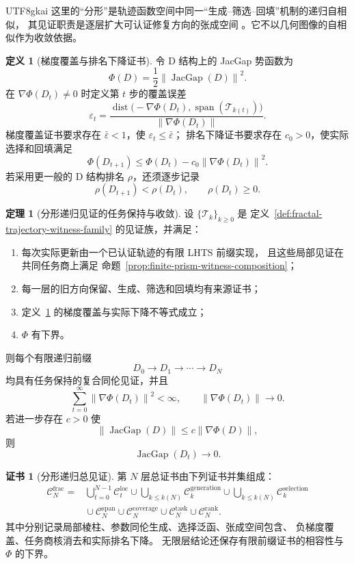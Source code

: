 \documentclass[12pt]{report}
\theoremstyle{definition}
\newtheorem{definition}{定义}[chapter]
\newtheorem{theorem}{定理}[chapter]
\newtheorem{Certificate}{证书}[chapter]
\newcommand{\JacGap}{\operatorname{JacGap}}
\newcommand{\norm}[1]{\left\lVert#1\right\rVert}
\begin{document}
\begin{CJK*}{UTF8}{gkai}
这里的“分形”是轨迹函数空间中同一“生成--筛选--回填”机制的递归自相似，
其见证职责是逐层扩大可认证修复方向的张成空间
\cite{tphlhts}。它不以几何图像的自相似作为收敛依据。

\begin{definition}[梯度覆盖与排名下降证书]
\label{def:gradient-coverage-ranking-certificate}
令 D 结构上的 JacGap 势函数为
\[
\Phi(D)=\frac12\norm{\JacGap(D)}^2.
\]
在 \(\nabla\Phi(D_t)\ne0\) 时定义第 \(t\) 步的覆盖误差
\[
\varepsilon_t
=
\frac{
\operatorname{dist}\bigl(
-\nabla\Phi(D_t),
\operatorname{span}(\mathcal T_{k(t)})
\bigr)}
{\norm{\nabla\Phi(D_t)}}.
\]
梯度覆盖证书要求存在 \(\bar\varepsilon<1\)，使
\(\varepsilon_t\le\bar\varepsilon\)；
排名下降证书要求存在 \(c_0>0\)，使实际选择和回填满足
\[
\boxed{
\Phi(D_{t+1})
\le
\Phi(D_t)-c_0\norm{\nabla\Phi(D_t)}^2.}
\]
若采用更一般的 D 结构排名 \(\rho\)，还须逐步记录
\[
\rho(D_{t+1})<\rho(D_t),
\qquad
\rho(D_t)\ge0.
\]
\end{definition}

\begin{theorem}[分形递归见证的任务保持与收敛]
\label{thm:fractal-recursive-witness-convergence}
设 \(\{\mathcal T_k\}_{k\ge0}\) 是
定义~\ref{def:fractal-trajectory-witness-family} 的见证族，并满足：
\begin{enumerate}
\item 每次实际更新由一个已认证轨迹的有限 LHTS 前缀实现，
      且这些局部见证在共同任务商上满足
      命题~\ref{prop:finite-prism-witness-composition}；
\item 每一层的旧方向保留、生成、筛选和回填均有来源证书；
\item 定义~\ref{def:gradient-coverage-ranking-certificate}
      的梯度覆盖与实际下降不等式成立；
\item \(\Phi\) 有下界。
\end{enumerate}
则每个有限递归前缀
\[
D_0\longrightarrow D_1\longrightarrow\cdots\longrightarrow D_N
\]
均具有任务保持的复合同伦见证，并且
\[
\sum_{t=0}^{\infty}\norm{\nabla\Phi(D_t)}^2<\infty,
\qquad
\norm{\nabla\Phi(D_t)}\longrightarrow0.
\]
若进一步存在 \(c>0\) 使
\[
\norm{\JacGap(D)}
\le c\norm{\nabla\Phi(D)},
\]
则
\[
\boxed{\JacGap(D_t)\longrightarrow0.}
\]
\end{theorem}

\begin{Certificate}[分形递归总见证]
\label{cert:fractal-recursive-total-witness}
第 \(N\) 层总证书由下列证书并集组成：
\[
\begin{aligned}
\mathcal C_N^{\mathrm{frac}}
= {}&
\bigcup_{t=0}^{N-1}\mathcal C_t^{\mathrm{loc}}
\cup
\bigcup_{k\le k(N)}\mathcal C_k^{\mathrm{generation}}
\cup
\bigcup_{k\le k(N)}\mathcal C_k^{\mathrm{selection}}
\\
&{}\cup
\mathcal C_N^{\mathrm{span}}
\cup
\mathcal C_N^{\mathrm{coverage}}
\cup
\mathcal C_N^{\mathrm{task}}
\cup
\mathcal C_N^{\mathrm{rank}}.
\end{aligned}
\]
其中分别记录局部棱柱、参数同伦生成、选择泛函、张成空间包含、
负梯度覆盖、任务商核消去和实际排名下降。
无限层结论还保存有限前缀证书的相容性与 \(\Phi\) 的下界。
\end{Certificate}


\end{CJK*}
\end{document}
